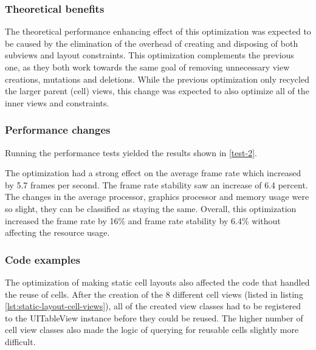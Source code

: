 \documentclass[a4paper,12pt]{article}
\begin{document}
\subsubsection{Theoretical benefits}
The theoretical performance enhancing effect of this optimization was expected to be caused by the elimination of the overhead of creating and disposing of both subviews and layout constraints. This optimization complements the previous one, as they both work towards the same goal of removing unnecessary view creations, mutations and deletions. While the previous optimization only recycled the larger parent (cell) views, this change was expected to also optimize all of the inner views and constraints.

\subsubsection{Performance changes}
Running the performance tests yielded the results shown in \autoref{test-2}.

The optimization had a strong effect on the average frame rate which increased by 5.7 frames per second. The frame rate stability saw an increase of 6.4 percent. The changes in the average processor, graphics processor and memory usage were so slight, they can be classified as staying the same. Overall, this optimization increased the frame rate by 16\% and frame rate stability by 6.4\% without affecting the resource usage.

\subsubsection{Code examples}
The optimization of making static cell layouts also affected the code that handled the reuse of cells. After the creation of the 8 different cell views (listed in listing \autoref{lst:static-layout-cell-views}), all of the created view classes had to be registered to the UITableView instance before they could be reused. The higher number of cell view classes also made the logic of querying for reusable cells slightly more difficult.
\end{document}
